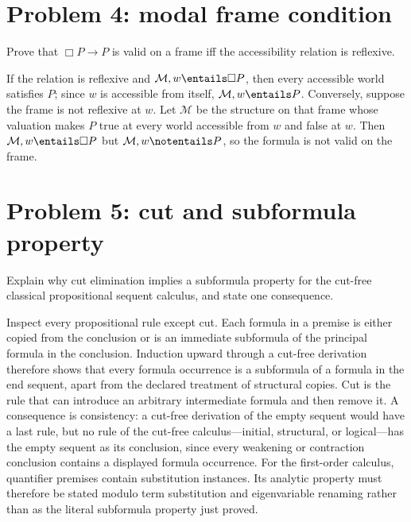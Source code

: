 \section{Problem 4: modal frame condition}
\label{sec:qualifying-problems-04}
\label{prob:modal-frame}

Prove that \(\Box P\to P\) is valid on a frame iff the accessibility relation is
reflexive.

\begin{solution}
If the relation is reflexive and
\(\mathcal M,w\entails\Box P\), then every accessible world satisfies \(P\);
since \(w\) is accessible from itself, \(\mathcal M,w\entails P\).  Conversely,
suppose the frame is not reflexive at \(w\).  Let \(\mathcal M\) be the
structure on that frame whose valuation makes \(P\) true at every world
accessible from \(w\) and false at \(w\).  Then
\(\mathcal M,w\entails\Box P\) but \(\mathcal M,w\notentails P\), so the
formula is not valid on the frame.
\end{solution}

\section{Problem 5: cut and subformula property}
\label{sec:qualifying-problems-05}
\label{prob:cut-subformula}

Explain why cut elimination implies a subformula property for the cut-free
classical propositional sequent calculus, and state one consequence.

\begin{solution}
Inspect every propositional rule except cut.  Each formula in a premise is either copied from
the conclusion or is an immediate subformula of the principal formula in the
conclusion.  Induction upward through a cut-free derivation therefore shows
that every formula occurrence is a subformula of a formula in the end sequent,
apart from the declared treatment of structural copies.  Cut is the rule that
can introduce an arbitrary intermediate formula and then remove it.  A
consequence is consistency: a cut-free derivation of the empty sequent
would have a last rule, but no rule of the cut-free calculus---initial,
structural, or logical---has the empty sequent as its conclusion, since
every weakening or contraction conclusion contains a displayed formula
occurrence.
For the first-order calculus, quantifier premises contain substitution
instances.  Its analytic property must therefore be stated modulo term
substitution and eigenvariable renaming rather than as the literal subformula
property just proved.
\end{solution}

